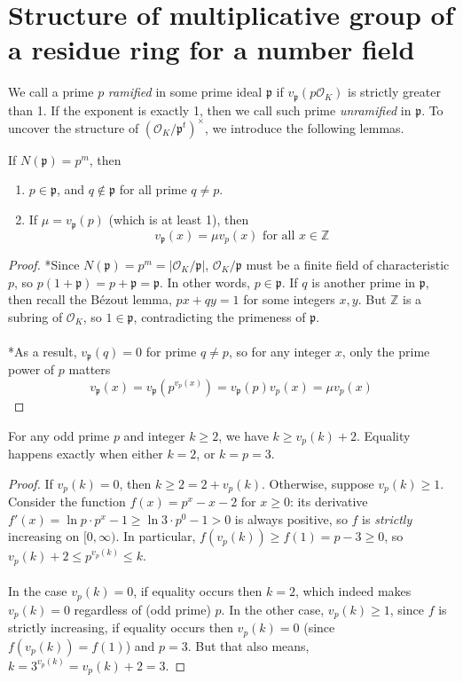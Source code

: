 \documentclass{treatise}
\begin{document}
\section{Structure of multiplicative group of a residue ring for a number field}
We call a prime $p$ \emph{ramified} in some prime ideal $\mathfrak{p}$ if $v_\mathfrak{p} (p \mathcal{O}_K)$ is strictly greater than 1. If the exponent is exactly 1, then we call such prime \emph{unramified} in $\mathfrak{p}$. To uncover the structure of $(\mathcal{O}_K / \mathfrak{p}^t)^\times$, we introduce the following lemmas.
\begin{lemma} \label{val-rami-prime}
If $N(\mathfrak{p}) = p^m$, then
\begin{enumerate}
	\item $p \in \mathfrak{p}$, and $q \notin \mathfrak{p}$ for all prime $q \neq p$.
	\item If $\mu = v_\mathfrak{p} (p)$ (which is at least 1), then
	$$v_\mathfrak{p} (x) = \mu v_p (x) \mbox{ for all } x \in \mathbb{Z}$$
\end{enumerate}
\end{lemma}
\begin{proof}
*Since $N(\mathfrak{p}) = p^m = |\mathcal{O}_K/\mathfrak{p}|$, $\mathcal{O}_K/\mathfrak{p}$ must be a finite field of characteristic $p$, so $p (1 + \mathfrak{p}) = p + \mathfrak{p} = \mathfrak{p}$. In other words, $p \in \mathfrak{p}$. If $q$ is another prime in $\mathfrak{p}$, then recall the Bézout lemma, $px + qy = 1$ for some integers $x, y$. But $\mathbb{Z}$ is a subring of $\mathcal{O}_K$, so $1 \in \mathfrak{p}$, contradicting the primeness of $\mathfrak{p}$.
\\
\\
*As a result, $v_\mathfrak{p}(q) = 0$ for prime $q \neq p$, so for any integer $x$, only the prime power of $p$ matters
$$v_\mathfrak{p} (x) = v_\mathfrak{p} (p^{v_p(x)}) = v_\mathfrak{p} (p) v_p (x) = \mu v_p (x)$$
\end{proof}
\begin{lemma} \label{odd-val-ineq}
For any odd prime $p$ and integer $k \geq 2$, we have $k \geq v_p (k) + 2$. Equality happens exactly when either $k = 2$, or $k = p = 3$.
\end{lemma}
\begin{proof}
If $v_p (k) = 0$, then $k \geq 2 = 2 + v_p (k)$. Otherwise, suppose $v_p(k) \geq 1$. Consider the function $f(x) = p^x - x - 2$ for $x \geq 0$: its derivative $f'(x) = \ln p \cdot p^x - 1 \geq \ln 3 \cdot p^0 - 1 > 0$ is always positive, so $f$ is \emph{strictly} increasing on $[0, \infty)$. In particular, $f(v_p(k)) \geq f(1) = p - 3 \geq 0$, so $v_p (k) + 2 \leq p^{v_p(k)} \leq k$.
\\
\\
In the case $v_p (k) = 0$, if equality occurs then $k = 2$, which indeed makes $v_p(k) = 0$ regardless of (odd prime) $p$. In the other case, $v_p(k) \geq 1$, since $f$ is strictly increasing, if equality occurs then $v_p (k) = 0$ (since $f(v_p(k)) = f(1)$) and $p = 3$. But that also means, $k = 3^{v_p(k)} = v_p(k) + 2 = 3$.
\end{proof}
\end{document}
